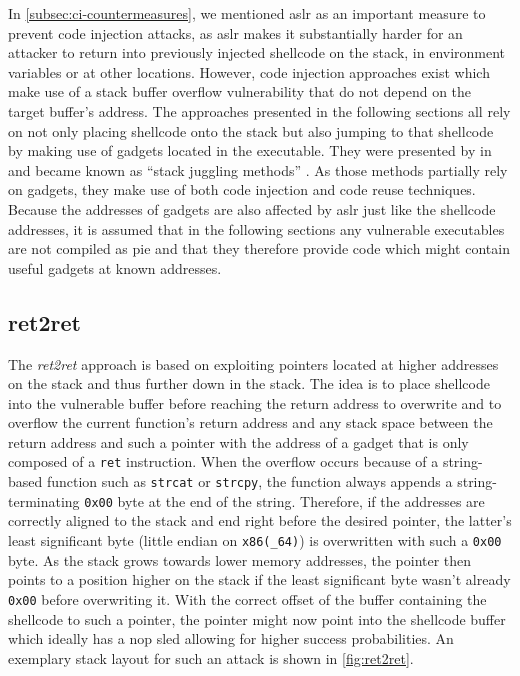 In \cref{subsec:ci-countermeasures}, we mentioned \gls{aslr} as an important measure to prevent code injection attacks, as \gls{aslr} makes it substantially harder for an attacker to return into previously injected shellcode on the stack, in environment variables or at other locations.
However, code injection approaches exist which make use of a stack buffer overflow vulnerability that do not depend on the target buffer's address.
The approaches presented in the following sections all rely on not only placing shellcode onto the stack but also jumping to that shellcode by making use of gadgets located in the executable.
They were presented by \citeauthor{Kotler2005} in \citeyear{Kotler2005} and became known as ``stack juggling methods'' \cites{Kotler2005}[10]{Mueller2008}.
As those methods partially rely on gadgets, they make use of both code injection and code reuse techniques.
Because the addresses of gadgets are also affected by \gls{aslr} just like the shellcode addresses, it is assumed that in the following sections any vulnerable executables are not compiled as \gls{pie} and that they therefore provide code which might contain useful gadgets at known addresses.

\subsection{ret2ret}
\label{subsec:aici-ret2ret}

The \emph{ret2ret} approach is based on exploiting pointers located at higher addresses on the stack and thus further down in the stack.
The idea is to place shellcode into the vulnerable buffer before reaching the return address to overwrite and to overflow the current function's return address and any stack space between the return address and such a pointer with the address of a gadget that is only composed of a \texttt{ret} instruction.
When the overflow occurs because of a string-based function such as \texttt{strcat} or \texttt{strcpy}, the function always appends a string-terminating \texttt{0x00} byte at the end of the string.
Therefore, if the addresses are correctly aligned to the stack and end right before the desired pointer, the latter's least significant byte (little endian on \texttt{x86(\_64)}) is overwritten with such a \texttt{0x00} byte.
As the stack grows towards lower memory addresses, the pointer then points to a position higher on the stack if the least significant byte wasn't already \texttt{0x00} before overwriting it.
With the correct offset of the buffer containing the shellcode to such a pointer, the pointer might now point into the shellcode buffer which ideally has a \acs{nop} sled allowing for higher success probabilities.
An exemplary stack layout for such an attack is shown in \cref{fig:ret2ret}.

